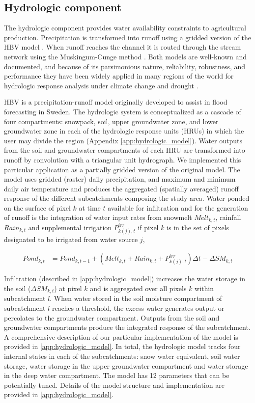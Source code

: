 \subsection{Hydrologic component}

The hydrologic component provides water availability constraints to agricultural production. Precipitation is transformed into runoff using a gridded version of the HBV model \citep{Bergstrom1973, Bergstrom1995, Lindstrom1997}. When runoff reaches the channel it is routed through the stream network using the Muskingum-Cunge method \cite{Cunge1969}. Both models are well-known and documented, and because of its parsimonious nature, reliability, robustness, and performance they have been widely applied in many regions of the world for hydrologic response analysis under climate change and drought \citep{Driessen2010, Menzel2002}. 

HBV is a precipitation-runoff model originally developed to assist in flood forecasting in Sweden. The hydrologic system is conceptualized as a cascade of four compartments: snowpack, soil, upper groundwater zone, and lower groundwater zone in each of the hydrologic response units (HRUs) in which the user may divide the region (Appendix \ref{app:hydrologic_model}). Water outputs from the soil and groundwater compartments of each HRU are transformed into runoff by convolution with a triangular unit hydrograph. We implemented this particular application as a partially gridded version of the original model. The model uses gridded (raster) daily precipitation, and maximum and minimum daily air temperature and produces the aggregated (spatially averaged) runoff response of the different subcatchments composing the study area. Water ponded on the surface of pixel $k$ at time $t$ available for infiltration and for the generation of runoff is the integration of water input rates from snowmelt $Melt_{k,t}$, rainfall $Rain_{k,t}$  and supplemental irrigation $P^{irr}_{k(j),t}$ if pixel $k$ is in the set of pixels designated to be irrigated from water source $j$,

\begin{align}
Pond_{k,t} &= Pond_{k,t-1} + (Melt_{k,t} + Rain_{k,t} +  P^{irr}_{k(j),t})\Delta t - \Delta SM_{k,t} 
\end{align} 

Infiltration (described in \ref{app:hydrologic_model}) increases the water storage in the soil ($\Delta SM_{k,t}$) at pixel $k$ and is aggregated over all pixels $k$ within subcatchment $l$. When water stored in the soil moisture compartment of subcatchment $l$ reaches a threshold, the excess water generates output or percolates to the groundwater compartment. Outputs from the soil and groundwater compartments produce the integrated response of the subcatchment. A comprehensive description of our particular implementation of the model is provided in \ref{app:hydrologic_model}. In total, the hydrologic model tracks four internal states in each of the subcatchments: snow water equivalent, soil water storage, water storage in the upper groundwater compartment and water storage in the deep water compartment. The model has \num{12} parameters that can be potentially tuned. Details of the model structure and implementation are provided in \ref{app:hydrologic_model}. 

